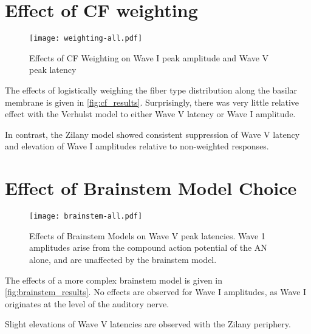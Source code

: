 

\section{Effect of CF weighting} %
\label{sec:effect_of_cf_weighting}
\begin{figure}[htbp]
	\centering
	\texttt{[image: weighting-all.pdf]}
	\caption[Effects of CF Weighting]{Effects of CF Weighting on Wave I peak amplitude and Wave V peak latency}
	\label{fig:cf_results}
\end{figure}

The effects of logistically weighing the fiber type distribution along the basilar membrane is given in \autoref{fig:cf_results}.  Surprisingly, there was very little relative effect with the Verhulst model to either Wave V latency or Wave I amplitude. 

In contrast, the Zilany model showed consistent suppression of Wave V latency and elevation of Wave I amplitudes relative to non-weighted responses.

\section{Effect of Brainstem Model Choice} %
\label{sec:effect_of_brainstem_model}
\begin{figure}[htbp]
	\centering
	\texttt{[image: brainstem-all.pdf]}
	\caption[Effects of Brainstem Models]{Effects of Brainstem Models on Wave V peak latencies.  Wave 1 amplitudes arise from the compound action potential of the AN alone, and are unaffected by the brainstem model.}
	\label{fig:brainstem_results}
\end{figure}

The effects of a more complex brainstem model is given in \autoref{fig:brainstem_results}.  No effects are observed for Wave I amplitudes, as Wave I originates at the level of the auditory nerve.  

Slight elevations of Wave V latencies are observed with the Zilany periphery. 
